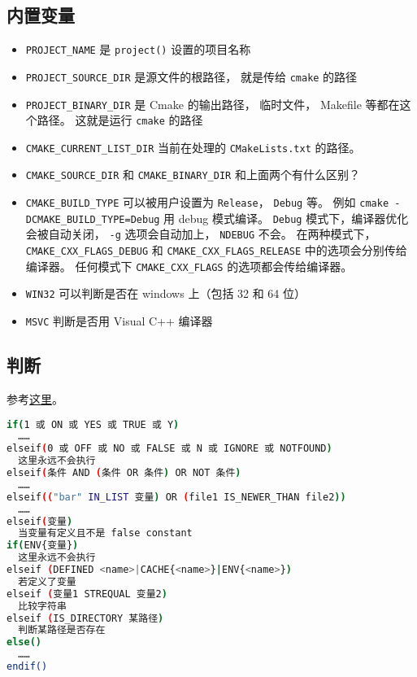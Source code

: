 \subsection{内置变量}
\begin{itemize}
\item \verb|PROJECT_NAME| 是 \verb|project()| 设置的项目名称
\item \verb`PROJECT_SOURCE_DIR` 是源文件的根路径， 就是传给 \verb`cmake` 的路径
\item \verb`PROJECT_BINARY_DIR` 是 Cmake 的输出路径， 临时文件， Makefile 等都在这个路径。 这就是运行 \verb`cmake` 的路径
\item \verb|CMAKE_CURRENT_LIST_DIR| 当前在处理的 \verb|CMakeLists.txt| 的路径。
\item \verb|CMAKE_SOURCE_DIR| 和 \verb|CMAKE_BINARY_DIR| 和上面两个有什么区别？
\item \verb|CMAKE_BUILD_TYPE| 可以被用户设置为 \verb|Release|， \verb|Debug| 等。 例如 \verb|cmake -DCMAKE_BUILD_TYPE=Debug| 用 debug 模式编译。 \verb|Debug| 模式下，编译器优化会被自动关闭， \verb|-g| 选项会自动加上， \verb|NDEBUG| 不会。 在两种模式下， \verb|CMAKE_CXX_FLAGS_DEBUG| 和 \verb|CMAKE_CXX_FLAGS_RELEASE| 中的选项会分别传给编译器。 任何模式下 \verb|CMAKE_CXX_FLAGS| 的选项都会传给编译器。
\item \verb|WIN32| 可以判断是否在 windows 上（包括 32 和 64 位）
\item \verb|MSVC| 判断是否用 Visual C++ 编译器
\end{itemize}

\subsection{判断}
参考\href{https://cmake.org/cmake/help/latest/command/if.html}{这里}。
\begin{lstlisting}[language=bash]
if(1 或 ON 或 YES 或 TRUE 或 Y)
  ……
elseif(0 或 OFF 或 NO 或 FALSE 或 N 或 IGNORE 或 NOTFOUND)
  这里永远不会执行
elseif(条件 AND (条件 OR 条件) OR NOT 条件)
  ……
elseif(("bar" IN_LIST 变量) OR (file1 IS_NEWER_THAN file2))
  ……
elseif(变量)
  当变量有定义且不是 false constant
if(ENV{变量})
  这里永远不会执行
elseif (DEFINED <name>|CACHE{<name>}|ENV{<name>})
  若定义了变量
elseif (变量1 STREQUAL 变量2)
  比较字符串
elseif (IS_DIRECTORY 某路径)
  判断某路径是否存在
else()
  ……
endif()
\end{lstlisting}

